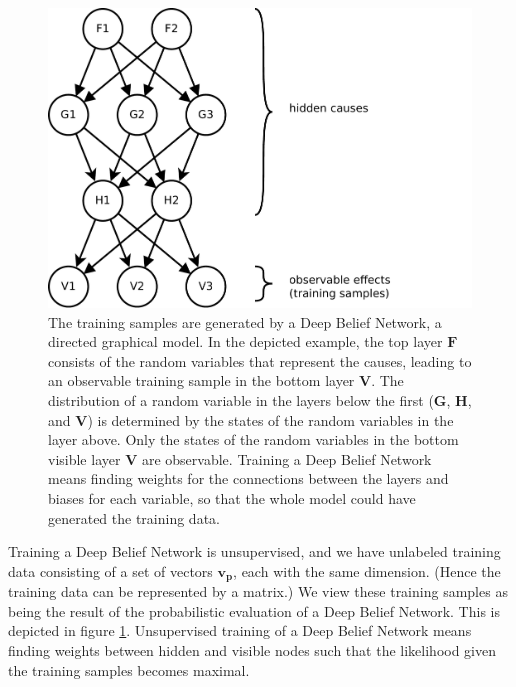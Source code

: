 \begin{figure}[t]
\begin{centering}
\includegraphics[width=0.50\paperwidth]{images/deep-belief-network}
\par\end{centering}
\caption[Training a Deep Belief Network]{\label{fig:training-a-DBN}The training samples are generated by
a Deep Belief Network, a directed graphical model. In the depicted
example, the top layer $\mathbf{F}$ consists of the random variables
that represent the causes, leading to an observable training sample
in the bottom layer $\mathbf{V}$. The distribution of a random variable
in the layers below the first ($\mathbf{G}$, $\mathbf{H}$, and $\mathbf{V}$)
is determined by the states of the random variables in the layer above.
Only the states of the random variables in the bottom visible layer
$\mathbf{V}$ are observable. Training a Deep Belief Network means
finding weights for the connections between the layers and biases
for each variable, so that the whole model could have generated the
training data.}
\end{figure}
Training a Deep Belief Network is unsupervised, and we have unlabeled
training data consisting of a set of vectors $\mathbf{v_{p}}$, each
with the same dimension. (Hence the training data can be represented
by a matrix.) We view these training samples as being the result of
the probabilistic evaluation of a Deep Belief Network. This is depicted
in figure \ref{fig:training-a-DBN}. Unsupervised training of a Deep
Belief Network means finding weights between hidden and visible nodes
such that the likelihood given the training samples becomes maximal.

